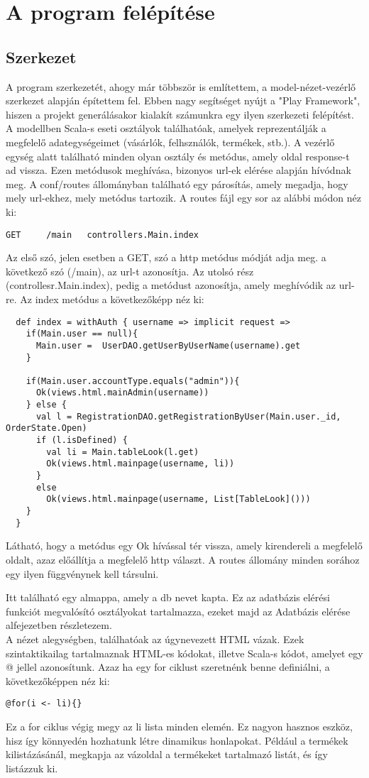 \section{A program felépítése}
\subsection{Szerkezet}
A program szerkezetét, ahogy már többször is említettem, a model-nézet-vezérlő szerkezet alapján építettem fel. Ebben nagy segítséget nyújt a "Play Framework", hiszen a projekt generálásakor kialakít számunkra egy ilyen szerkezeti felépítést. A modellben Scala-s eseti osztályok találhatóak, amelyek reprezentálják a megfelelő adategységeimet (vásárlók, felhsználók, termékek, stb.). A vezérlő egység alatt található minden olyan osztály és metódus, amely oldal response-t ad vissza. Ezen metódusok meghívása, bizonyos url-ek elérése alapján hívódnak meg. A conf/routes állományban található egy párosítás, amely megadja, hogy mely url-ekhez, mely metódus tartozik. A routes fájl egy sor az alábbi módon néz ki:
\begin{verbatim}
GET     /main   controllers.Main.index
\end{verbatim}
Az első szó, jelen esetben a GET, szó a http metódus módját adja meg. a következő szó (/main), az url-t azonosítja. Az utolsó rész (controllesr.Main.index), pedig a metódust azonosítja, amely meghívódik az url-re. Az index metódus a következőképp néz ki:
\begin{verbatim}
  def index = withAuth { username => implicit request =>
    if(Main.user == null){
      Main.user =  UserDAO.getUserByUserName(username).get
    }

    if(Main.user.accountType.equals("admin")){
      Ok(views.html.mainAdmin(username))
    } else {
      val l = RegistrationDAO.getRegistrationByUser(Main.user._id, OrderState.Open)
      if (l.isDefined) {
        val li = Main.tableLook(l.get)
        Ok(views.html.mainpage(username, li))
      }
      else
        Ok(views.html.mainpage(username, List[TableLook]()))
    }
  }
\end{verbatim}
Látható, hogy a metódus egy Ok hívással tér vissza, amely kirendereli a megfelelő oldalt, azaz előállítja a megfelelő http választ. A routes állomány minden sorához egy ilyen függvénynek kell társulni.

Itt található egy almappa, amely a db nevet kapta. Ez az adatbázis elérési funkciót megvalósító osztályokat tartalmazza, ezeket majd az Adatbázis elérése alfejezetben részletezem.\\
A nézet alegységben, találhatóak az úgynevezett HTML vázak. Ezek szintaktikailag tartalmaznak HTML-es kódokat, illetve Scala-s kódot, amelyet egy @ jellel azonosítunk. Azaz ha egy for ciklust szeretnénk benne definiálni, a következőképpen néz ki:
\begin{verbatim}
@for(i <- li){}
\end{verbatim}
Ez a for ciklus végig megy az li lista minden elemén. Ez nagyon hasznos eszköz, hisz így könnyedén hozhatunk létre dinamikus honlapokat. Például a termékek kilistázásánál, megkapja az vázoldal a termékeket tartalmazó listát, és így listázzuk ki.

